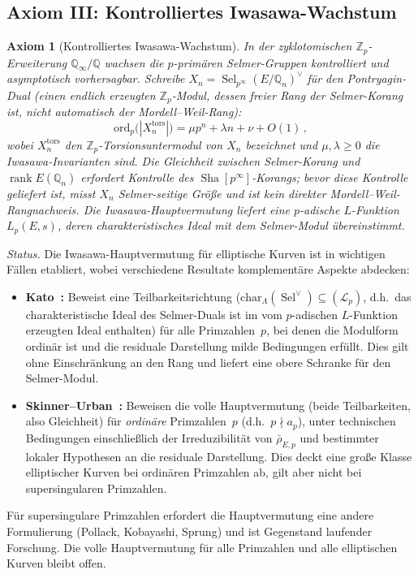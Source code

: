\documentclass[aps,prd,twocolumn,superscriptaddress,nofootinbib,floatfix]{revtex4-2}
\newtheorem{axiom}[theorem]{Axiom}
\theoremstyle{definition}
\theoremstyle{remark}
\DeclareMathOperator{\rank}{rank}
\DeclareMathOperator{\Sel}{Sel}
\DeclareMathOperator{\Sha}{Sha}
\begin{document}
\subsection{Axiom III: Kontrolliertes Iwasawa-Wachstum}

\begin{axiom}[Kontrolliertes Iwasawa-Wachstum]
\label{ax:iwasawa}
In der zyklotomischen $\mathbb{Z}_p$-Erweiterung $\mathbb{Q}_\infty/\mathbb{Q}$ wachsen die $p$-primären Selmer-Gruppen kontrolliert und asymptotisch vorhersagbar. Schreibe $X_n = \Sel_{p^\infty}(E/\mathbb{Q}_n)^\vee$ für den Pontryagin-Dual (einen endlich erzeugten $\mathbb{Z}_p$-Modul, dessen freier Rang der Selmer-Korang ist, nicht automatisch der Mordell--Weil-Rang):
\begin{equation}
\mathrm{ord}_p\!\bigl(|X_n^{\mathrm{tors}}|\bigr) = \mu p^n + \lambda n + \nu + O(1)\,,
\label{eq:iwasawa_growth}
\end{equation}
wobei $X_n^{\mathrm{tors}}$ den $\mathbb{Z}_p$-Torsionsuntermodul von $X_n$ bezeichnet und $\mu, \lambda \geq 0$ die Iwasawa-Invarianten sind. Die Gleichheit zwischen Selmer-Korang und $\rank E(\mathbb{Q}_n)$ erfordert Kontrolle des $\Sha[p^\infty]$-Korangs; bevor diese Kontrolle geliefert ist, misst $X_n$ Selmer-seitige Größe und ist kein direkter Mordell--Weil-Rangnachweis. Die Iwasawa-Hauptvermutung liefert eine $p$-adische $L$-Funktion $L_p(E,s)$, deren charakteristisches Ideal mit dem Selmer-Modul übereinstimmt.
\end{axiom}

\textit{Status.} Die Iwasawa-Hauptvermutung für elliptische Kurven ist in wichtigen Fällen etabliert, wobei verschiedene Resultate komplementäre Aspekte abdecken:
\begin{itemize}
\item \textbf{Kato~\cite{Kato2004}:} Beweist eine Teilbarkeitsrichtung ($\mathrm{char}_\Lambda(\Sel^\vee) \subseteq (\mathcal{L}_p)$, d.h.\ das charakteristische Ideal des Selmer-Duals ist im vom $p$-adischen $L$-Funktion erzeugten Ideal enthalten) für alle Primzahlen~$p$, bei denen die Modulform ordinär ist und die residuale Darstellung milde Bedingungen erfüllt. Dies gilt ohne Einschränkung an den Rang und liefert eine obere Schranke für den Selmer-Modul.
\item \textbf{Skinner--Urban~\cite{SkinnerUrban2014}:} Beweisen die volle Hauptvermutung (beide Teilbarkeiten, also Gleichheit) für \textit{ordinäre} Primzahlen~$p$ (d.h.\ $p \nmid a_p$), unter technischen Bedingungen einschließlich der Irreduzibilität von $\bar{\rho}_{E,p}$ und bestimmter lokaler Hypothesen an die residuale Darstellung. Dies deckt eine große Klasse elliptischer Kurven bei ordinären Primzahlen ab, gilt aber nicht bei supersingularen Primzahlen.
\end{itemize}
Für supersingulare Primzahlen erfordert die Hauptvermutung eine andere Formulierung (Pollack, Kobayashi, Sprung) und ist Gegenstand laufender Forschung. Die volle Hauptvermutung für alle Primzahlen und alle elliptischen Kurven bleibt offen.
\end{document}
